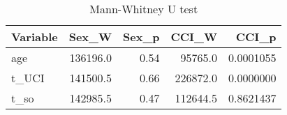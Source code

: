 \begin{table}

\caption{Mann-Whitney U test}
\centering
\begin{tabular}[t]{l|r|r|r|r}
\hline
Variable & Sex\_W & Sex\_p & CCI\_W & CCI\_p\\
\hline
age & 136196.0 & 0.54 & 95765.0 & 0.0001055\\
\hline
t\_UCI & 141500.5 & 0.66 & 226872.0 & 0.0000000\\
\hline
t\_so & 142985.5 & 0.47 & 112644.5 & 0.8621437\\
\hline
\end{tabular}
\end{table}
